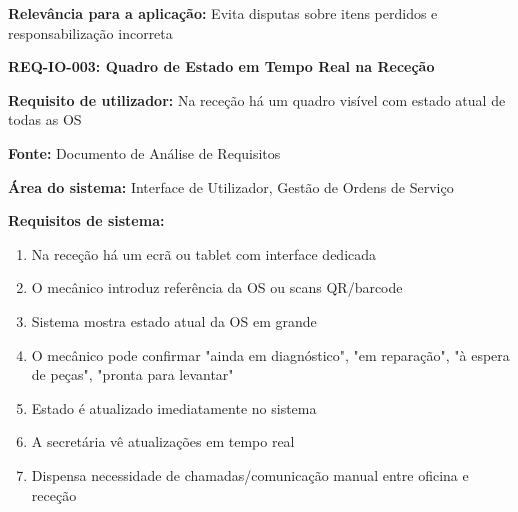 \documentclass[11pt,a4paper]{article}
\newcommand{\reqheader}[1]{{\noindent\large\bfseries\color{sectionblue}#1}\par\vspace{0.3cm}}
\newcommand{\reqfield}[2]{{\noindent\textbf{#1:} #2}\par\vspace{0.2cm}}
\begin{document}
\reqfield{Relevância para a aplicação}{Evita disputas sobre itens perdidos e responsabilização incorreta}

\vspace{0.8cm}

\reqheader{REQ-IO-003: Quadro de Estado em Tempo Real na Receção}

\reqfield{Requisito de utilizador}{Na receção há um quadro visível com estado atual de todas as OS}

\reqfield{Fonte}{Documento de Análise de Requisitos}

\reqfield{Área do sistema}{Interface de Utilizador, Gestão de Ordens de Serviço}

\reqfield{Requisitos de sistema}{
	\begin{enumerate}
		\item Na receção há um ecrã ou tablet com interface dedicada
		\item O mecânico introduz referência da OS ou scans QR/barcode
		\item Sistema mostra estado atual da OS em grande
		\item O mecânico pode confirmar "ainda em diagnóstico", "em reparação", "à espera de peças", "pronta para levantar"
		\item Estado é atualizado imediatamente no sistema
		\item A secretária vê atualizações em tempo real
		\item Dispensa necessidade de chamadas/comunicação manual entre oficina e receção
	\end{enumerate}
}

\vspace{0.8cm}
\end{document}
